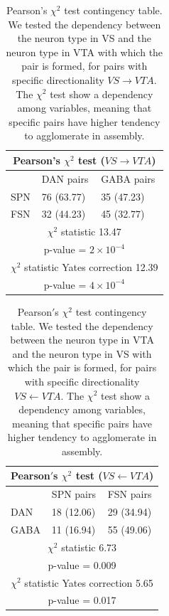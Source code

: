 \begin{table}[H]
\begin{tabular}{ |p{3cm}|p{3cm}|p{3cm}| }
 \hline
 \multicolumn{3}{|c|}{Pearson's $\chi^2$ test ($VS \rightarrow VTA$)} \\
 \hline
 & DAN pairs & GABA pairs\\
 \hline
 SPN & 76 (63.77) & 35 (47.23) \\
 \hline
 FSN & 32 (44.23) & 45 (32.77)\\
 \hline
 \multicolumn{3}{|c|}{$\chi^2$ statistic  13.47}\\
 \multicolumn{3}{|c|}{p-value = $2\times10^{-4}$}\\
 \hline
 \multicolumn{3}{|c|}{$\chi^2$ statistic Yates correction 12.39}\\
 \multicolumn{3}{|c|}{p-value = $4\times10^{-4}$}\\
 \hline
\end{tabular}
\caption{Pearson's $\chi^{2}$ test contingency table. We tested the dependency between the neuron type in VS and the neuron type in VTA with which the pair is formed, for pairs with specific directionality $VS \rightarrow VTA$. The $\chi^2$ test show a dependency among variables, meaning that specific pairs have higher tendency to agglomerate in assembly.}
\label{tab:chisquare_vsvta}
\end{table}
\begin{table}[H]
\begin{tabular}{ |p{3cm}|p{3cm}|p{3cm}| }
 \hline
 \multicolumn{3}{|c|}{Pearson$'$s $\chi^2$ test ($VS \leftarrow VTA$)} \\
 \hline
 & SPN pairs & FSN pairs\\
 \hline
 DAN & 18 (12.06) & 29 (34.94) \\
 \hline
 GABA & 11 (16.94) & 55 (49.06)\\
 \hline
 \multicolumn{3}{|c|}{$\chi^2$ statistic  6.73}\\
 \multicolumn{3}{|c|}{p-value = 0.009}\\
 \hline
 \multicolumn{3}{|c|}{$\chi^2$ statistic Yates correction 5.65}\\
 \multicolumn{3}{|c|}{p-value = 0.017}\\
 \hline
\end{tabular}
\caption{Pearson$'$s $\chi^{2}$ test contingency table. We tested the dependency between the neuron type in VTA and the neuron type in VS with which the pair is formed, for pairs with specific directionality $VS \leftarrow VTA$. The $\chi^2$ test show a dependency among variables, meaning that specific pairs have higher tendency to agglomerate in assembly.}
\label{tab:chisquare_vtavs}
\end{table}
